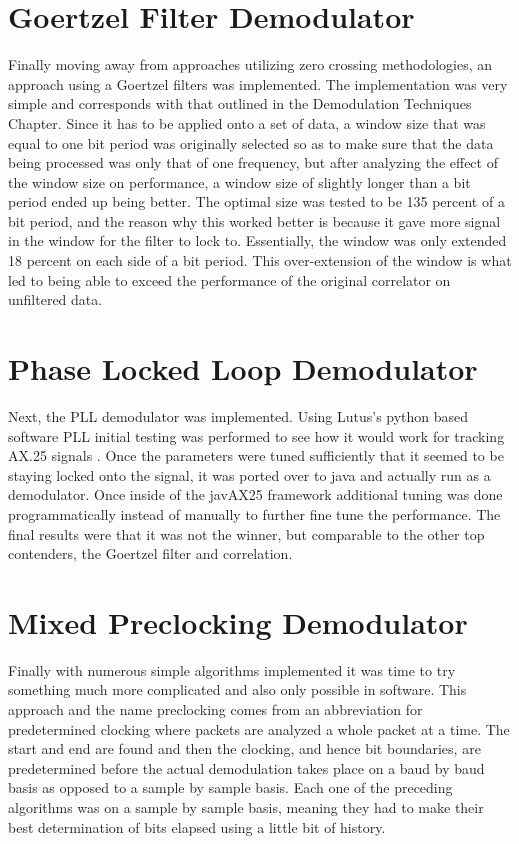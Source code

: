 \section{Goertzel Filter Demodulator}
Finally moving away from approaches utilizing zero crossing methodologies, an approach using a Goertzel filters was implemented. The implementation was very simple and corresponds with that outlined in the Demodulation Techniques Chapter. Since it has to be applied onto a set of data, a window size that was equal to one bit period was originally selected so as to make sure that the data being processed was only that of one frequency, but after analyzing the effect of the window size on performance, a window size of slightly longer than a bit period ended up being better. The optimal size was tested to be 135 percent of a bit period, and the reason why this worked better is because it gave more signal in the window for the filter to lock to. Essentially, the window was only extended 18 percent on each side of a bit period. This over-extension of the window is what led to being able to exceed the performance of the original correlator on unfiltered data.

\section{Phase Locked Loop Demodulator}
Next, the PLL demodulator was implemented. Using Lutus's python based software PLL initial testing was performed to see how it would work for tracking AX.25 signals \cite{Lutus2011}. Once the parameters were tuned sufficiently that it seemed to be staying locked onto the signal, it was ported over to java and actually run as a demodulator. Once inside of the javAX25 framework additional tuning was done programmatically instead of manually to further fine tune the performance. The final results were that it was not the winner, but comparable to the other top contenders, the Goertzel filter and correlation.

\section{Mixed Preclocking Demodulator}
Finally with numerous simple algorithms implemented it was time to try something much more complicated and also only possible in software. This approach and the name preclocking comes from an abbreviation for predetermined clocking where packets are analyzed a whole packet at a time. The start and end are found and then the clocking, and hence bit boundaries, are predetermined before the actual demodulation takes place on a baud by baud basis as opposed to a sample by sample basis. Each one of the preceding algorithms was on a sample by sample basis, meaning they had to make their best determination of bits elapsed using a little bit of history.

